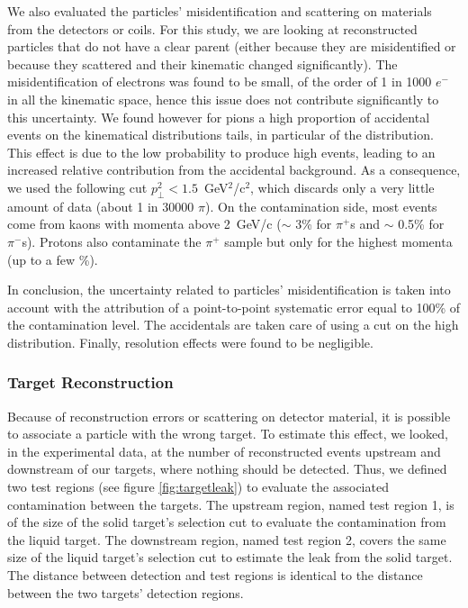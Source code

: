 We also evaluated the particles' misidentification and scattering on materials
from the detectors or coils. For this study, we are looking at reconstructed 
particles that do not have a clear parent (either because they are misidentified
or because they scattered and their kinematic changed significantly). The 
misidentification of electrons was found to be small, of the order of 1 in 
1000 $e^-$ in all the kinematic space, hence this issue does not contribute 
significantly to this uncertainty. We found however for pions
a high proportion of accidental events on the kinematical distributions tails, 
in particular of the \pt distribution. This effect is due to the low 
probability to produce high \pt events, leading to an increased relative 
contribution from the accidental background. As a consequence, we used the 
following cut $p_\perp^2 < 1.5$~GeV$^2$/c$^2$, which discards only a very 
little amount of data (about 1 in 30000 $\pi$). On the contamination side,
most events come from kaons with momenta above 2~GeV/c ($\sim$ 3\% for 
$\pi^+$s and $\sim$ 0.5\% for $\pi^-$s). Protons also contaminate the 
$\pi^+$ sample but only for the highest momenta (up to a few \%). 

In conclusion, the uncertainty related to particles' misidentification is 
taken into account with the attribution of a point-to-point systematic 
error equal to 100\% of the contamination level. The accidentals are taken 
care of using a cut on the high \pt distribution. Finally, resolution effects
were found to be negligible.

\subsubsection{Target Reconstruction}

Because of reconstruction errors or scattering on detector material, it 
is possible to associate a particle with the wrong target. To estimate this 
effect, we looked, in the experimental data, at the number of reconstructed 
events upstream and downstream of our targets, where nothing should be 
detected. Thus, we defined two test regions (see figure \ref{fig:targetleak}) 
to evaluate the associated contamination between the targets. The upstream 
region, named test region 1, is of the size of the solid target's selection 
cut to evaluate the contamination from the liquid target. The downstream region, 
named test region 2, covers the same size of the liquid target's selection cut 
to estimate the leak from the solid target. The distance between detection and 
test regions is identical to the distance between the two targets' detection 
regions. 


